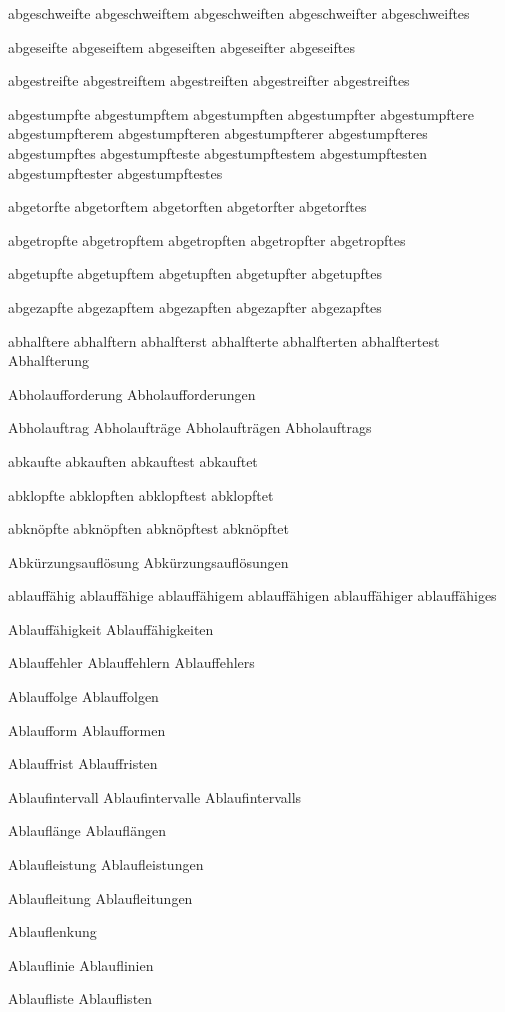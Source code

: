 abgeschweifte
abgeschweiftem
abgeschweiften
abgeschweifter
abgeschweiftes

abgeseifte
abgeseiftem
abgeseiften
abgeseifter
abgeseiftes

abgestreifte
abgestreiftem
abgestreiften
abgestreifter
abgestreiftes

abgestumpfte
abgestumpftem
abgestumpften
abgestumpfter
abgestumpftere
abgestumpfterem
abgestumpfteren
abgestumpfterer
abgestumpfteres
abgestumpftes
abgestumpfteste
abgestumpftestem
abgestumpftesten
abgestumpftester
abgestumpftestes

abgetorfte
abgetorftem
abgetorften
abgetorfter
abgetorftes

abgetropfte
abgetropftem
abgetropften
abgetropfter
abgetropftes

abgetupfte
abgetupftem
abgetupften
abgetupfter
abgetupftes

abgezapfte
abgezapftem
abgezapften
abgezapfter
abgezapftes

abhalftere
abhalftern
abhalfterst
abhalfterte
abhalfterten
abhalftertest
Abhalfterung

Abholaufforderung
Abholaufforderungen

Abholauftrag
Abholaufträge
Abholaufträgen
Abholauftrags

abkaufte
abkauften
abkauftest
abkauftet

abklopfte
abklopften
abklopftest
abklopftet

abknöpfte
abknöpften
abknöpftest
abknöpftet

Abkürzungsauflösung
Abkürzungsauflösungen

ablauffähig
ablauffähige
ablauffähigem
ablauffähigen
ablauffähiger
ablauffähiges

Ablauffähigkeit 
Ablauffähigkeiten

Ablauffehler
Ablauffehlern
Ablauffehlers

Ablauffolge
Ablauffolgen

Ablaufform
Ablaufformen

Ablauffrist
Ablauffristen

Ablaufintervall
Ablaufintervalle
Ablaufintervalls

Ablauflänge
Ablauflängen

Ablaufleistung
Ablaufleistungen

Ablaufleitung
Ablaufleitungen

Ablauflenkung

Ablauflinie
Ablauflinien

Ablaufliste
Ablauflisten

